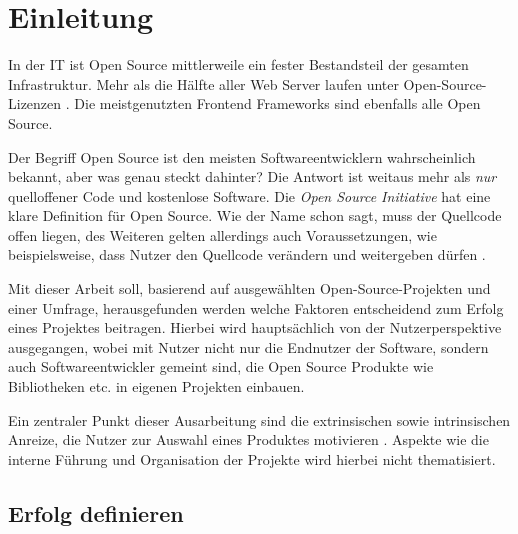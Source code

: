 \chapter{Einleitung}



In der IT ist Open Source mittlerweile ein fester Bestandsteil der gesamten Infrastruktur.
Mehr als die Hälfte aller Web Server laufen unter Open-Source-Lizenzen \cite{W3Techs_WebServer}.
Die meistgenutzten Frontend Frameworks sind ebenfalls alle Open Source. \cite{StackOverflowSurvey2021}


Der Begriff Open Source ist den meisten Softwareentwicklern wahrscheinlich bekannt,
aber was genau steckt dahinter? Die Antwort ist weitaus mehr als \textit{nur} quelloffener Code
und kostenlose Software.
Die \textit{Open Source Initiative} hat eine klare Definition für Open Source.
Wie der Name schon sagt, muss der Quellcode offen liegen, des Weiteren gelten allerdings auch
Voraussetzungen, wie beispielsweise, dass Nutzer den Quellcode verändern und weitergeben
dürfen \cite{OpenSourceDefinition}.


Mit dieser Arbeit soll, basierend auf ausgewählten Open-Source-Projekten und einer Umfrage,
herausgefunden werden welche Faktoren entscheidend zum Erfolg eines Projektes beitragen.
Hierbei wird hauptsächlich von der Nutzerperspektive ausgegangen, wobei mit Nutzer nicht nur die
Endnutzer der Software, sondern auch Softwareentwickler gemeint sind, die Open Source Produkte wie
Bibliotheken etc. in eigenen Projekten einbauen.

Ein zentraler Punkt dieser Ausarbeitung sind die extrinsischen sowie intrinsischen Anreize,
die Nutzer zur Auswahl eines Produktes motivieren \cite{midhaFactorsAffectingSuccess2012}. %
Aspekte wie die interne Führung und Organisation der Projekte wird hierbei nicht thematisiert.


\section{Erfolg definieren}


